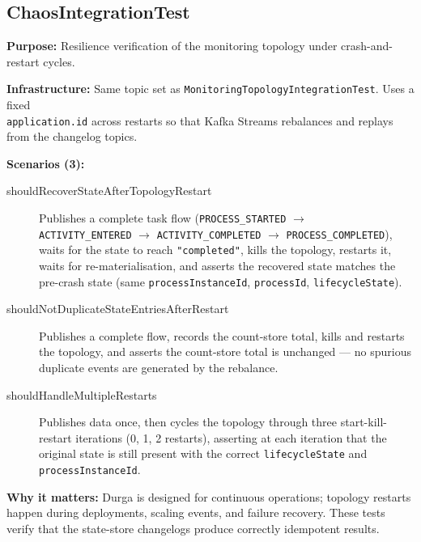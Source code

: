 
\subsection{ChaosIntegrationTest}
\label{it:chaos}

\textbf{Purpose:} Resilience verification of the monitoring topology under
crash-and-restart cycles.

\textbf{Infrastructure:} Same topic set as \texttt{MonitoringTopologyIntegrationTest}.
Uses a fixed \\ \texttt{application.id} across restarts so that Kafka Streams
rebalances and replays from the changelog topics.

\textbf{Scenarios (3):}

\begin{description}

\item[shouldRecoverStateAfterTopologyRestart] Publishes a complete task
flow (\texttt{PROCESS\_STARTED} $\to$ \\ \texttt{ACTIVITY\_ENTERED} $\to$
\texttt{ACTIVITY\_COMPLETED} $\to$ \texttt{PROCESS\_COMPLETED}), waits for
the state to reach \texttt{"completed"}, kills the topology, restarts it,
waits for re-materialisation, and asserts the recovered state matches the
pre-crash state (same \texttt{processInstanceId}, \texttt{processId},
\texttt{lifecycleState}).

\item[shouldNotDuplicateStateEntriesAfterRestart] Publishes a complete
flow, records the count-store total, kills and restarts the topology,
and asserts the count-store total is unchanged --- no spurious
duplicate events are generated by the rebalance.

\item[shouldHandleMultipleRestarts] Publishes data once, then cycles the
topology through three start-kill-restart iterations (0, 1, 2 restarts),
asserting at each iteration that the original state is still present
with the correct \texttt{lifecycleState} and \texttt{processInstanceId}.

\end{description}

\textbf{Why it matters:} Durga is designed for continuous operations;
topology restarts happen during deployments, scaling events, and failure
recovery. These tests verify that the state-store changelogs produce
correctly idempotent results.

